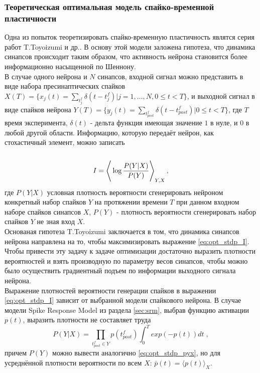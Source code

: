 \documentclass[a4paper,10pt]{article}
\def\la{\left\langle\rule{0pt}{3em}}
\def\ra{\right\rangle}
\begin{document}
\subsubsection{Теоретическая оптимальная модель спайко-временной пластичности}
\indent Одна из попыток теоретизировать спайко-временную пластичность являтся серия работ T.Toyoizumi и др.\cite{OptStdpFirst, OptStdpSecond}. В основу этой модели заложена гипотеза, что динамика синапсов происходит таким образом, что активность нейрона становится более информационно насыщенной по Шеннону.\\
\indent В случае одного нейрона и $N$ синапсов, входной сигнал можно представить в виде набора пресинаптических спайков $X(T)=\{ x_{j}(t)=\sum_{t_{j}^f}\delta(t-t_{j}^f) |j=1,...,N, 0 \leq t<T \}$, и выходной сигнал в виде спайков нейрона $Y(T)=\{ y_{j}(t)=\sum_{t_{post}^f}\delta(t-t_{post}^f) | 0 \leq t<T \}$, где $T$ время эксперимента, $\delta(t)$ - дельта функция имеющая значение $1$ в нуле, и $0$ в любой другой области. Информацию, которую передаёт нейрон, как стохастичный элемент, можно записать 
\begin{equation}\label{eq:opt_stdp_I}
I = \la\log \frac{P(Y|X)}{P(Y)} \ra_{Y,X},
\end{equation}
где $P(Y|X)$ условная плотность вероятности сгенерировать нейроном конкретный набор спайков $Y$ на протяжении времени $T$ при данном входном наборе спайков синапсов $X$, $P(Y)$ - плотность вероятности сгенерировать набор спайков $Y$ не зная вход $X$.\\
\indent Основаная гипотеза T.Toyoizumi заключается в том, что динамика синапсов нейрона направлена на то, чтобы максимизировать выражение \eqref{eq:opt_stdp_I}. Чтобы привести эту задачу к задаче оптимизации достаточно выразить плотности вероятностей и взять производную по параметру весов синапсов, чтобы можно было осуществить градиентный подъем по информации выходного сигнала нейрона.\\
\indent Выражение плотностей вероятности генерации спайков в выражении \eqref{eq:opt_stdp_I} зависит от выбранной модели спайкового нейрона. В случае модели Spike Response Model из раздела \ref{sec:srm}, выбрав функцию активации $p(t)$, выразить плотности не составляет труда
\begin{equation}\label{eq:opt_stdp_pyx}
P(Y|X)= \prod_{t_{post}^{f} \in Y } p(t_{post}^{f}) \int_{0}^{T} exp(-p(t))dt\;,
\end{equation}
причем $P(Y)$ можно вывести аналогично \eqref{eq:opt_stdp_pyx}, но для усреднённой плотности вероятности по всем $X$: $\bar{p}(t) = \langle p(t) \rangle _{X}$.\\
\end{document}
